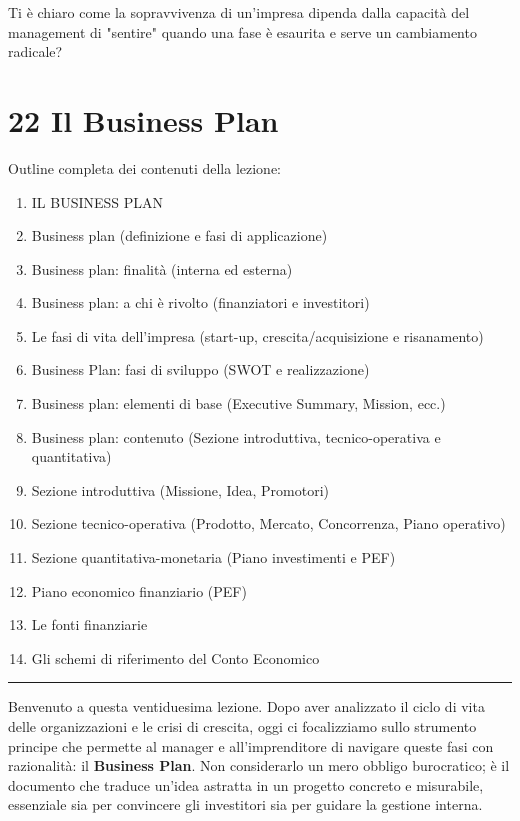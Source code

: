\documentclass[a4paper,10pt]{article}
\begin{document}
Ti è chiaro come la sopravvivenza di un'impresa dipenda dalla capacità del management di "sentire" quando una fase è esaurita e serve un cambiamento radicale?

\section*{22 Il Business Plan}

Outline completa dei contenuti della lezione:
{\small
\begin{enumerate}
\item IL BUSINESS PLAN
\item Business plan (definizione e fasi di applicazione)
\item Business plan: finalità (interna ed esterna)
\item Business plan: a chi è rivolto (finanziatori e investitori)
\item Le fasi di vita dell’impresa (start-up, crescita/acquisizione e risanamento)
\item Business Plan: fasi di sviluppo (SWOT e realizzazione)
\item Business plan: elementi di base (Executive Summary, Mission, ecc.)
\item Business plan: contenuto (Sezione introduttiva, tecnico-operativa e quantitativa)
\item Sezione introduttiva (Missione, Idea, Promotori)
\item Sezione tecnico-operativa (Prodotto, Mercato, Concorrenza, Piano operativo)
\item Sezione quantitativa-monetaria (Piano investimenti e PEF)
\item Piano economico finanziario (PEF)
\item Le fonti finanziarie
\item Gli schemi di riferimento del Conto Economico
\end{enumerate}
}
\hrule
\vspace{0.5cm}

Benvenuto a questa ventiduesima lezione. Dopo aver analizzato il ciclo di vita delle organizzazioni e le crisi di crescita, oggi ci focalizziamo sullo strumento principe che permette al manager e all'imprenditore di navigare queste fasi con razionalità: il \textbf{Business Plan}. Non considerarlo un mero obbligo burocratico; è il documento che traduce un'idea astratta in un progetto concreto e misurabile, essenziale sia per convincere gli investitori sia per guidare la gestione interna.
\end{document}

